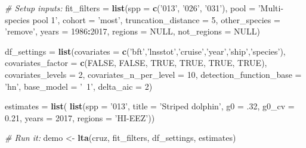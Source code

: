 \documentclass[
]{book}
\newenvironment{Shaded}{\begin{snugshade}}{\end{snugshade}}
\newcommand{\CommentTok}[1]{\textcolor[rgb]{0.56,0.35,0.01}{\textit{#1}}}
\newcommand{\DataTypeTok}[1]{\textcolor[rgb]{0.13,0.29,0.53}{#1}}
\newcommand{\DecValTok}[1]{\textcolor[rgb]{0.00,0.00,0.81}{#1}}
\newcommand{\FloatTok}[1]{\textcolor[rgb]{0.00,0.00,0.81}{#1}}
\newcommand{\KeywordTok}[1]{\textcolor[rgb]{0.13,0.29,0.53}{\textbf{#1}}}
\newcommand{\NormalTok}[1]{#1}
\newcommand{\OperatorTok}[1]{\textcolor[rgb]{0.81,0.36,0.00}{\textbf{#1}}}
\newcommand{\OtherTok}[1]{\textcolor[rgb]{0.56,0.35,0.01}{#1}}
\newcommand{\StringTok}[1]{\textcolor[rgb]{0.31,0.60,0.02}{#1}}
\begin{document}
\begin{Shaded}
\begin{Highlighting}[]
\CommentTok{# Setup inputs:}
\NormalTok{fit_filters =}\StringTok{ }\KeywordTok{list}\NormalTok{(}\DataTypeTok{spp =} \KeywordTok{c}\NormalTok{(}\StringTok{'013'}\NormalTok{, }\StringTok{'026'}\NormalTok{, }\StringTok{'031'}\NormalTok{), }
                   \DataTypeTok{pool =} \StringTok{'Multi-species pool 1'}\NormalTok{,}
                   \DataTypeTok{cohort =} \StringTok{'most'}\NormalTok{,}
                   \DataTypeTok{truncation_distance =} \DecValTok{5}\NormalTok{,}
                   \DataTypeTok{other_species =} \StringTok{'remove'}\NormalTok{,}
                   \DataTypeTok{years =} \DecValTok{1986}\OperatorTok{:}\DecValTok{2017}\NormalTok{,}
                   \DataTypeTok{regions =} \OtherTok{NULL}\NormalTok{,}
                   \DataTypeTok{not_regions =} \OtherTok{NULL}\NormalTok{)}

\NormalTok{df_settings =}\StringTok{ }\KeywordTok{list}\NormalTok{(}\DataTypeTok{covariates =} \KeywordTok{c}\NormalTok{(}\StringTok{'bft'}\NormalTok{,}\StringTok{'lnsstot'}\NormalTok{,}\StringTok{'cruise'}\NormalTok{,}\StringTok{'year'}\NormalTok{,}\StringTok{'ship'}\NormalTok{,}\StringTok{'species'}\NormalTok{),}
                   \DataTypeTok{covariates_factor =} \KeywordTok{c}\NormalTok{(}\OtherTok{FALSE}\NormalTok{, }\OtherTok{FALSE}\NormalTok{, }\OtherTok{TRUE}\NormalTok{, }\OtherTok{TRUE}\NormalTok{, }\OtherTok{TRUE}\NormalTok{, }\OtherTok{TRUE}\NormalTok{),}
                   \DataTypeTok{covariates_levels =} \DecValTok{2}\NormalTok{,}
                   \DataTypeTok{covariates_n_per_level =} \DecValTok{10}\NormalTok{,}
                   \DataTypeTok{detection_function_base =} \StringTok{'hn'}\NormalTok{,}
                   \DataTypeTok{base_model =} \StringTok{'~1'}\NormalTok{,}
                   \DataTypeTok{delta_aic =} \DecValTok{2}\NormalTok{)}

\NormalTok{estimates =}
\StringTok{  }\KeywordTok{list}\NormalTok{(}
    \KeywordTok{list}\NormalTok{(}\DataTypeTok{spp =} \StringTok{'013'}\NormalTok{,}
         \DataTypeTok{title =} \StringTok{'Striped dolphin'}\NormalTok{,}
         \DataTypeTok{g0 =} \FloatTok{.32}\NormalTok{, }\DataTypeTok{g0_cv =} \FloatTok{0.21}\NormalTok{,}
         \DataTypeTok{years =} \DecValTok{2017}\NormalTok{,}
         \DataTypeTok{regions =} \StringTok{'HI-EEZ'}\NormalTok{))}

\CommentTok{# Run it:}
\NormalTok{demo <-}\StringTok{ }\KeywordTok{lta}\NormalTok{(cruz,}
\NormalTok{    fit_filters,}
\NormalTok{    df_settings,}
\NormalTok{    estimates)}
\end{Highlighting}
\end{Shaded}
\end{document}
